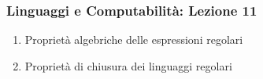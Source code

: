 




\begin{frame}[fragile]
	\frametitle{Linguaggi e Computabilità: Lezione 11}
\begin{enumerate}
\item
Proprietà algebriche delle espressioni regolari
\item
Proprietà di chiusura dei linguaggi regolari
\end{enumerate}
\end{frame}




